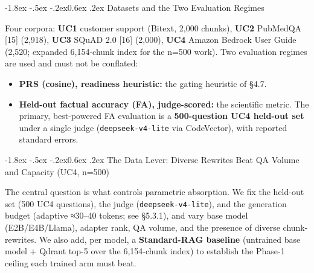 \documentclass[10pt,twocolumn]{article}
\makeatletter
\providecommand{\tightlist}{\setlength{\itemsep}{0pt}\setlength{\parskip}{0pt}}
\renewcommand\subsection{\@startsection{subsection}{2}{\z@}%
  {-1.8ex \@plus -.5ex \@minus -.2ex}{0.6ex \@plus .2ex}%
  {\normalfont\normalsize\bfseries}}
\makeatother
\begin{document}
\hypertarget{datasets-and-the-two-evaluation-regimes}{%
\subsection{Datasets and the Two Evaluation Regimes}\label{datasets-and-the-two-evaluation-regimes}}

Four corpora: \textbf{UC1} customer support (Bitext, 2,000 chunks), \textbf{UC2} PubMedQA {[}15{]} (2,918), \textbf{UC3} SQuAD 2.0 {[}16{]} (2,000), \textbf{UC4} Amazon Bedrock User Guide (2,520; expanded 6,154-chunk index for the n=500 work). Two evaluation regimes are used and must not be conflated:

\begin{itemize}
\tightlist
\item
  \textbf{PRS (cosine), readiness heuristic:} the gating heuristic of §4.7.
\item
  \textbf{Held-out factual accuracy (FA), judge-scored:} the scientific metric. The primary, best-powered FA evaluation is a \textbf{500-question UC4 held-out set} under a single judge (\texttt{deepseek-v4-lite} via CodeVector), with reported standard errors.
\end{itemize}

\hypertarget{the-data-lever-diverse-rewrites-beat-qa-volume-and-capacity-uc4-n500}{%
\subsection{The Data Lever: Diverse Rewrites Beat QA Volume and Capacity (UC4, n=500)}\label{the-data-lever-diverse-rewrites-beat-qa-volume-and-capacity-uc4-n500}}

The central question is what controls parametric absorption. We fix the held-out set (500 UC4 questions), the judge (\texttt{deepseek-v4-lite}), and the generation budget (adaptive ≈30--40 tokens; see §5.3.1), and vary base model (E2B/E4B/Llama), adapter rank, QA volume, and the presence of diverse chunk-rewrites. We also add, per model, a \textbf{Standard-RAG baseline} (untrained base model + Qdrant top-5 over the 6,154-chunk index) to establish the Phase-1 ceiling each trained arm must beat.
\end{document}
